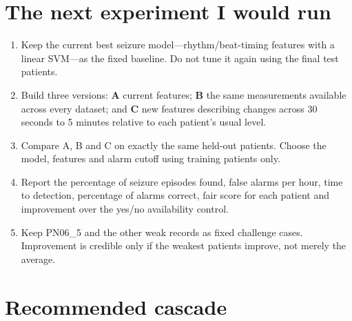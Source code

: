 \documentclass[9pt]{extarticle}
\begin{document}
\section*{The next experiment I would run}
\begin{enumerate}
\item Keep the current best seizure model---rhythm/beat-timing features with a linear SVM---as the fixed baseline. Do not tune it again using the final test patients.
\item Build three versions: \textbf{A} current features; \textbf{B} the same measurements available across every dataset; and \textbf{C} new features describing changes across 30 seconds to 5 minutes relative to each patient's usual level.
\item Compare A, B and C on exactly the same held-out patients. Choose the model, features and alarm cutoff using training patients only.
\item Report the percentage of seizure episodes found, false alarms per hour, time to detection, percentage of alarms correct, fair score for each patient and improvement over the yes/no availability control.
\item Keep PN06\_5 and the other weak records as fixed challenge cases. Improvement is credible only if the weakest patients improve, not merely the average.
\end{enumerate}

\section*{Recommended cascade}
\noindent{}
\end{document}
